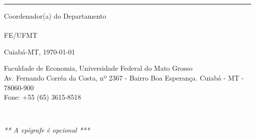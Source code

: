 \documentclass{tcc}
\begin{document}
\hrule
\noindent Coordenador(a) do Departamento \departamento\\
\coordenador\\
FE/UFMT\\

\vfill

\begin{center}
Cuiabá-MT, \today
\end{center}

\vspace{0.05in}

\begin{center}
\footnotesize{ Faculdade de Economia, Universidade Federal do Mato Grosso\\
Av. Fernando Corrêa da Costa, nº 2367 - Bairro Boa Esperança. Cuiabá - MT - 78060-900 \\
Fone: +55 (65) 3615-8518 }
\end{center}
\afterpage{\blankpage \addtocounter{page}{1}}
\newpage
$ $
\vfill

\begin{flushright}
\em *** A epígrafe é opcional ***
\end{flushright}

\afterpage{\blankpage \addtocounter{page}{1}}

\newpage

\section*{} 


\newpage



\newpage


\newpage



\newpage

\renewcommand{\listfigurename}{\centering LISTA DE FIGURAS}
\listoffigures
\newpage

\renewcommand{\listtablename}{\centering LISTA DE TABELAS}
\listoftables
\newpage



\newpage


\pagestyle{plain} %
\tableofcontents

\newpage







\renewcommand{\refname}{\centering REFERÊNCIAS} %











\end{document}
